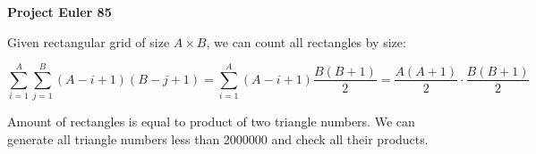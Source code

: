 \documentclass[a4paper,12pt]{article}
\begin{document}
\setlength\parindent{0pt}
\textbf{Project Euler 85}
\vspace{5ex}


Given rectangular grid of size \(A \times B\), we can count all rectangles
by size:

\[\sum_{i = 1}^A \sum_{j = 1}^B (A - i + 1)(B - j + 1) =
\sum_{i = 1}^A (A - i + 1) \frac{B(B + 1)}{2} =
\frac{A(A + 1)}{2} \cdot \frac{B(B + 1)}{2}\]

Amount of rectangles is equal to product of two triangle numbers.
We can generate all triangle numbers less than 2000000 and check all
their products.
\end{document}
